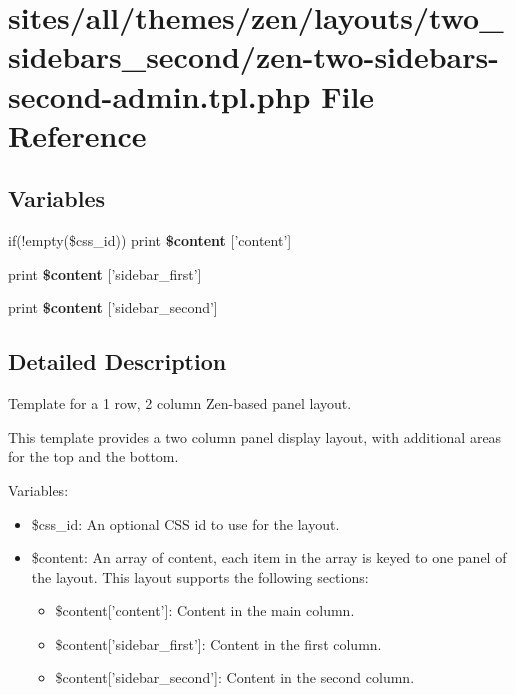 \hypertarget{zen-two-sidebars-second-admin_8tpl_8php}{
\section{sites/all/themes/zen/layouts/two\_\-sidebars\_\-second/zen-two-sidebars-second-admin.tpl.php File Reference}
\label{zen-two-sidebars-second-admin_8tpl_8php}
}
\subsection*{Variables}
\begin{CompactItemize}
\item 
\hypertarget{zen-two-sidebars-second-admin_8tpl_8php_16767ac2e2b027ec00a0c12535d2ba7a}{
if(!empty(\$css\_\-id)) print \textbf{\$content} \mbox{[}'content'\mbox{]}}
\label{zen-two-sidebars-second-admin_8tpl_8php_16767ac2e2b027ec00a0c12535d2ba7a}

\item 
\hypertarget{zen-two-sidebars-second-admin_8tpl_8php_8fbe76276dfb5a084cc042c32e8e6394}{
print \textbf{\$content} \mbox{[}'sidebar\_\-first'\mbox{]}}
\label{zen-two-sidebars-second-admin_8tpl_8php_8fbe76276dfb5a084cc042c32e8e6394}

\item 
\hypertarget{zen-two-sidebars-second-admin_8tpl_8php_4f8fb8ae436a00e7bdfe8b16bc3f0dd4}{
print \textbf{\$content} \mbox{[}'sidebar\_\-second'\mbox{]}}
\label{zen-two-sidebars-second-admin_8tpl_8php_4f8fb8ae436a00e7bdfe8b16bc3f0dd4}

\end{CompactItemize}


\subsection{Detailed Description}
Template for a 1 row, 2 column Zen-based panel layout.

This template provides a two column panel display layout, with additional areas for the top and the bottom.

Variables:\begin{itemize}
\item \$css\_\-id: An optional CSS id to use for the layout.\item \$content: An array of content, each item in the array is keyed to one panel of the layout. This layout supports the following sections:\begin{itemize}
\item \$content\mbox{[}'content'\mbox{]}: Content in the main column.\item \$content\mbox{[}'sidebar\_\-first'\mbox{]}: Content in the first column.\item \$content\mbox{[}'sidebar\_\-second'\mbox{]}: Content in the second column. \end{itemize}
\end{itemize}
